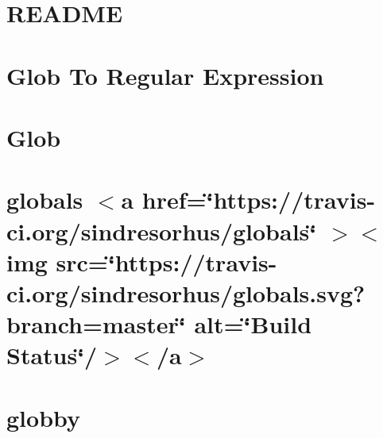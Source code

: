 \documentclass[twoside]{book}
\newcommand{\+}{\discretionary{\mbox{\scriptsize$\hookleftarrow$}}{}{}}
\begin{document}
\chapter{README}
\label{md__c___users_vaishnavi_jadhav__desktop__developer_code_mean_stack_example_client_node_modules_glob_parent__r_e_a_d_m_e}

\chapter{Glob To Regular Expression}
\label{md__c___users_vaishnavi_jadhav__desktop__developer_code_mean_stack_example_client_node_modules_glob_to_regexp__r_e_a_d_m_e}

\chapter{Glob}
\label{md__c___users_vaishnavi_jadhav__desktop__developer_code_mean_stack_example_client_node_modules_glob__r_e_a_d_m_e}

\chapter{globals \texorpdfstring{$<$}{<}a href=\char`\"{}https\+://travis-\/ci.\+org/sindresorhus/globals\char`\"{} \texorpdfstring{$>$}{>}\texorpdfstring{$<$}{<}img src=\char`\"{}https\+://travis-\/ci.\+org/sindresorhus/globals.\+svg?branch=master\char`\"{} alt=\char`\"{}\+Build Status\char`\"{}/\texorpdfstring{$>$}{>}\texorpdfstring{$<$}{<}/a\texorpdfstring{$>$}{>}}
\label{md__c___users_vaishnavi_jadhav__desktop__developer_code_mean_stack_example_client_node_modules_globals_readme}

\chapter{globby}
\label{md__c___users_vaishnavi_jadhav__desktop__developer_code_mean_stack_example_client_node_modules_globby_readme}

\end{document}
